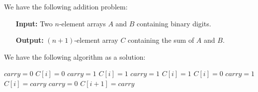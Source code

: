 
We have the following addition problem:

\begin{itemize}
    \item[\textbf{Input:}] Two $n$-element arrays $A$ and $B$ containing binary digits.
    \item[\textbf{Output:}] $(n+1)$-element array $C$ containing the sum of $A$ and $B$.
\end{itemize}

We have the following algorithm as a solution:

\begin{algorithmic}[1]
    \STATE $\mathit{carry} = 0$
                \STATE $C[i] = 0$
                \STATE $\mathit{carry} = 1$
            \ELSE
                \STATE $C[i] = 1$
                \STATE $\mathit{carry} = 1$
            \ENDIF
                \STATE $C[i] = 1$
            \ELSE
                \STATE $C[i] = 0$
                \STATE $\mathit{carry} = 1$
            \ENDIF
        \ELSE
            \STATE $C[i] = \mathit{carry}$
            \STATE $\mathit{carry} = 0$
        \ENDIF
    \ENDFOR
    \STATE $C[i + 1] = \mathit{carry}$
\end{algorithmic}

